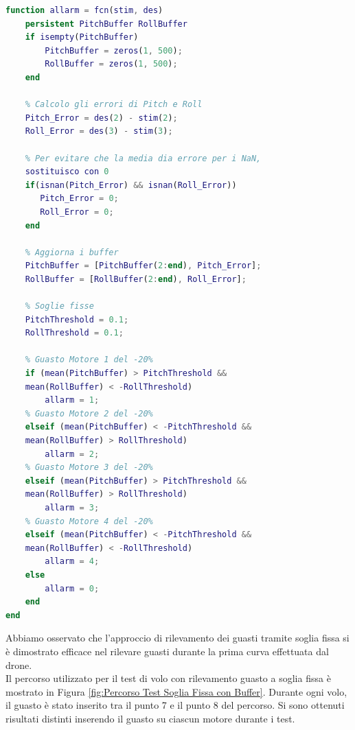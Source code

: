 \begin{lstlisting}[language=Matlab, caption={Descrizione del codice}, label={lst:codice_matlab}]
function allarm = fcn(stim, des)
    persistent PitchBuffer RollBuffer
    if isempty(PitchBuffer)
        PitchBuffer = zeros(1, 500);
        RollBuffer = zeros(1, 500);
    end

    % Calcolo gli errori di Pitch e Roll
    Pitch_Error = des(2) - stim(2);
    Roll_Error = des(3) - stim(3);

    % Per evitare che la media dia errore per i NaN, 
    sostituisco con 0
    if(isnan(Pitch_Error) && isnan(Roll_Error))
       Pitch_Error = 0;
       Roll_Error = 0;
    end

    % Aggiorna i buffer
    PitchBuffer = [PitchBuffer(2:end), Pitch_Error];
    RollBuffer = [RollBuffer(2:end), Roll_Error];

    % Soglie fisse
    PitchThreshold = 0.1;
    RollThreshold = 0.1;

    % Guasto Motore 1 del -20%
    if (mean(PitchBuffer) > PitchThreshold && 
    mean(RollBuffer) < -RollThreshold)
        allarm = 1;
    % Guasto Motore 2 del -20%
    elseif (mean(PitchBuffer) < -PitchThreshold && 
    mean(RollBuffer) > RollThreshold)
        allarm = 2;
    % Guasto Motore 3 del -20%
    elseif (mean(PitchBuffer) > PitchThreshold && 
    mean(RollBuffer) > RollThreshold)
        allarm = 3;
    % Guasto Motore 4 del -20%
    elseif (mean(PitchBuffer) < -PitchThreshold && 
    mean(RollBuffer) < -RollThreshold)
        allarm = 4;
    else
        allarm = 0;
    end
end
\end{lstlisting}
\noindent
Abbiamo osservato che l'approccio di rilevamento dei guasti tramite soglia fissa si è dimostrato efficace nel rilevare guasti durante la prima curva effettuata dal drone.
\\
Il percorso utilizzato per il test di volo con rilevamento guasto a soglia fissa è mostrato in Figura \ref{fig:Percorso Test Soglia Fissa con Buffer}. Durante ogni volo, il guasto è stato inserito tra il punto 7 e il punto 8 del percorso. Si sono ottenuti risultati distinti inserendo il guasto su ciascun motore durante i test.

